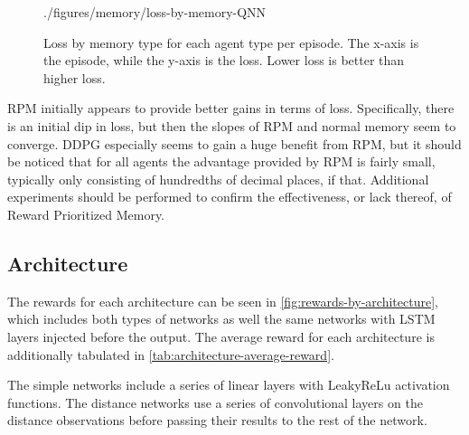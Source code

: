 \begin{figure}[!ht]
    {./figures/memory/loss-by-memory-QNN}
    \caption{
        Loss by memory type for each agent type per episode.
        The x-axis is the episode, while the y-axis is the loss.
        Lower loss is better than higher loss.
    }
    \label{fig:loss-by-memory}
\end{figure}

RPM initially appears to provide better gains in terms of loss.
Specifically, there is an initial dip in loss, but then the slopes of RPM and normal
memory seem to converge.
DDPG especially seems to gain a huge benefit from RPM, but it should be noticed that
for all agents the advantage provided by RPM is fairly small, typically only
consisting of hundredths of decimal places, if that.
Additional experiments should be performed to confirm the effectiveness, or lack
thereof, of Reward Prioritized Memory.

\subsection{Architecture}\label{subsec:architecture}
The rewards for each architecture can be seen in
\autoref{fig:rewards-by-architecture}, which includes both types of networks as well
the same networks with LSTM layers injected before the output.
The average reward for each architecture is additionally tabulated in
\autoref{tab:architecture-average-reward}.

The simple networks include a series of linear layers with LeakyReLu activation
functions.
The distance networks use a series of convolutional layers on the distance
observations before passing their results to the rest of the network.

